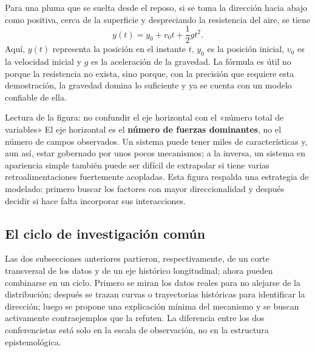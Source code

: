 
Para una pluma que se suelta desde el reposo, si se toma la dirección hacia abajo como positiva, cerca de la superficie y despreciando la resistencia del aire, se tiene
\[
y(t)=y_0+v_0t+\frac{1}{2}gt^2.
\]
Aquí, $y(t)$ representa la posición en el instante $t$, $y_0$ es la posición inicial, $v_0$ es la velocidad inicial y $g$ es la aceleración de la gravedad. La fórmula es útil no porque la resistencia no exista, sino porque, con la precisión que requiere esta demostración, la gravedad domina lo suficiente y ya se cuenta con un modelo confiable de ella.



\begin{knowledgebox}{Lectura de la figura: no confundir el eje horizontal con el «número total de variables»}
El eje horizontal es el \textbf{número de fuerzas dominantes}, no el número de campos observados. Un sistema puede tener miles de características y, aun así, estar gobernado por unos pocos mecanismos; a la inversa, un sistema en apariencia simple también puede ser difícil de extrapolar si tiene varias retroalimentaciones fuertemente acopladas. Esta figura respalda una estrategia de modelado: primero buscar los factores con mayor direccionalidad y después decidir si hace falta incorporar sus interacciones.
\end{knowledgebox}

\subsection{El ciclo de investigación común}

Las dos subsecciones anteriores partieron, respectivamente, de un corte transversal de los datos y de un eje histórico longitudinal; ahora pueden combinarse en un ciclo. Primero se miran los datos reales para no alejarse de la distribución; después se trazan curvas o trayectorias históricas para identificar la dirección; luego se propone una explicación mínima del mecanismo y se buscan activamente contraejemplos que la refuten. La diferencia entre los dos conferencistas está solo en la escala de observación, no en la estructura epistemológica.

